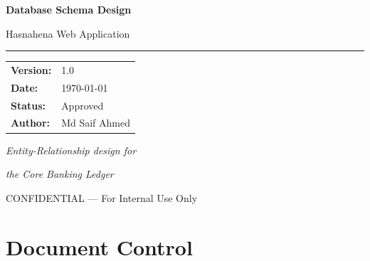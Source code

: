 \documentclass[11pt,a4paper]{article}
\newcommand{\DocumentTitle}{Database Schema Design}
\newcommand{\DocumentSubtitle}{Hasnahena Web Application}
\newcommand{\DocumentVersion}{1.0}
\newcommand{\DocumentDate}{\today}
\begin{document}
\begin{titlepage}
    \centering
    \vspace*{2cm}
    
    {\Huge\bfseries\color{primaryblue}\DocumentTitle\par}
    \vspace{0.5cm}
    {\LARGE\color{darkgray}\DocumentSubtitle\par}
    
    \vspace{1.5cm}
    
    {\color{primaryblue}\rule{10cm}{2pt}\par}
    
    \vspace{2cm}
    
    \begin{tabular}{ll}
        \textbf{Version:} & \DocumentVersion \\[0.5em]
        \textbf{Date:} & \DocumentDate \\[0.5em]
        \textbf{Status:} & Approved \\[0.5em]
        \textbf{Author:} & Md Saif Ahmed \\[0.5em]
    \end{tabular}
    
    \vfill
    
    {\large\color{darkgray}\textit{Entity-Relationship design for}\par}
    {\large\color{darkgray}\textit{the Core Banking Ledger}\par}
    
    \vspace{1cm}
    
    {\footnotesize\color{darkgray}CONFIDENTIAL --- For Internal Use Only\par}
\end{titlepage}

\tableofcontents
\newpage

\section*{Document Control}
\end{document}
